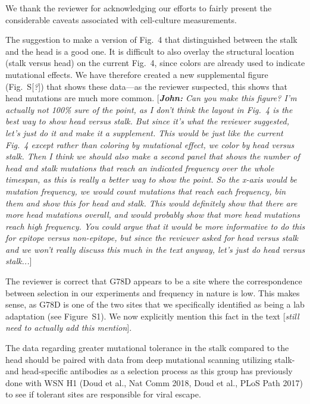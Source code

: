 \documentclass[11pt, oneside]{article}   	%
\newcommand{\comment}[1]{{\color{red}[\textsl{#1}]}}
\newcommand{\response}[1]{{\color{black}#1}}
\begin{document}
\response{We thank the reviewer for acknowledging our efforts to fairly present the considerable caveats associated with cell-culture measurements.

The suggestion to make a version of Fig.~4 that distinguished between the stalk and the head is a good one.
It is difficult to also overlay the structural location (stalk versus head) on the current Fig.~4, since colors are already used to indicate mutational effects.
We have therefore created a new supplemental figure (Fig.~S\comment{?}) that shows these data---as the reviewer suspected, this shows that head mutations are much more common.
\comment{{\bf John:} Can you make this figure? I'm actually not 100\% sure of the point, as I don't think the layout in Fig.~4 is the best way to show head versus stalk. 
But since it's what the reviewer suggested, let's just do it and make it a supplement.
This would be just like the current Fig.~4 except rather than coloring by mutational effect, we color by head versus stalk.
Then I think we should also make a second panel that shows the number of head and stalk mutations that reach an indicated frequency over the whole timespan, as this is really a better way to show the point.
So the x-axis would be mutation frequency, we would count mutations that reach each frequency, bin them and show this for head and stalk.
This would definitely show that there are more head mutations overall, and would probably show that more head mutations reach high frequency.
You could argue that it would be more informative to do this for epitope versus non-epitope, but since the reviewer asked for head versus stalk and we won't really discuss this much in the text anyway, let's just do head versus stalk...}

The reviewer is correct that G78D appears to be a site where the correspondence between selection in our experiments and frequency in nature is low.
This makes sense, as G78D is one of the two sites that we specifically identified as being a lab adaptation (see Figure~S1).
We now explicitly mention this fact in the text \comment{still need to actually add this mention}.
} 

The data regarding greater mutational tolerance in the stalk compared to the head should be paired with data from deep mutational scanning utilizing stalk- and head-specific antibodies as a selection process as this group has previously done with WSN H1 (Doud et al., Nat Comm 2018, Doud et al., PLoS Path 2017) to see if tolerant sites are responsible for viral escape. 
\end{document}
